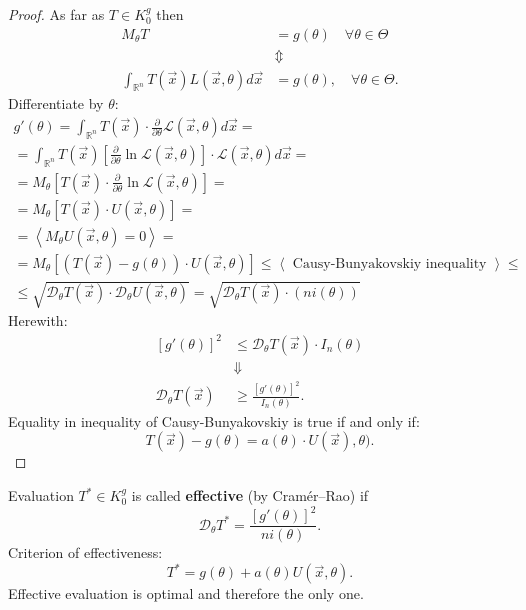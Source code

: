 \begin{proof}
   As far as $T \in K_{0}^{g}$ then
   \begin{align*}
        M_{\theta}T &= g(\theta) \quad \forall \theta \in \Theta \\
        & \Updownarrow \\
        \int_{\mathbb{R}^{n}}^{} T(\vec{x}) L(\vec{x}, \theta) d\vec{x} &= 
        g(\theta), \quad \forall \theta \in \Theta
   .\end{align*}
   Differentiate by $\theta$:
   \begin{gather*}
       g'(\theta) = \int_{\mathbb{R}^{n}}^{} T(\vec{x})\cdot
       \frac{\partial}{\partial \theta} \mathcal{L}(\vec{x}, \theta) d\vec{x} = \\
       = \int_{\mathbb{R}^{n}}^{} T(\vec{x}) \left[ 
       \frac{\partial}{\partial \theta} \ln \mathcal{L}(\vec{x}, \theta) \right] 
       \cdot \mathcal{L}(\vec{x}, \theta) d\vec{x} = \\
       = M_{\theta}\left[ T(\vec{x}) \cdot \frac{\partial}{\partial \theta} \ln
       \mathcal{L}(\vec{x}, \theta) \right] = \\
       = M_{\theta}\left[ T(\vec{x}) \cdot U(\vec{x}, \theta) \right] = \\
       = \left< M_{\theta}U(\vec{x}, \theta) = 0 \right> = \\
       = M_{\theta}\left[ \left( T(\vec{x}) - g(\theta) \right) \cdot
       U(\vec{x}, \theta) \right] \leq \left<
       \text{ Causy-Bunyakovskiy inequality } \right> \leq \\
       \leq \sqrt{\mathcal{D}_{\theta}T(\vec{x}) \cdot
       \mathcal{D}_{\theta}U(\vec{x}, \theta)} =
       \sqrt{\mathcal{D}_{\theta} T(\vec{x}) \cdot \left( n i(\theta) \right) } 
   \end{gather*}
   Herewith:
   \begin{align*}
       \left[ g'(\theta) \right] ^2 &\leq \mathcal{D}_{\theta} T(\vec{x}) \cdot
       I_{n} (\theta) \\
        & \Downarrow \\
       \mathcal{D}_{\theta}T(\vec{x}) &\geq \frac{\left[ 
       g'(\theta) \right] ^2}{I_{n}(\theta)}
   .\end{align*}
   Equality in inequality of Causy-Bunyakovskiy is true if and only if:
   \[
   T(\vec{x}) - g(\theta) = a(\theta) \cdot U(\vec{x}), \theta)
   .\] 
\end{proof}

\begin{definition}
    Evaluation $T^{*} \in K_{0}^{g}$ is called \textbf{effective} (by Cramér–Rao) if
    \[
    \mathcal{D}_{\theta}T^{*} = \frac{\left[ g'(\theta) \right] ^2}{ni(\theta)}
    .\] 
    Criterion of effectiveness:
    \[
    T^{*} = g(\theta) + a(\theta) U(\vec{x}, \theta)
    .\] 
    Effective evaluation is optimal and therefore the only one.
\end{definition}

